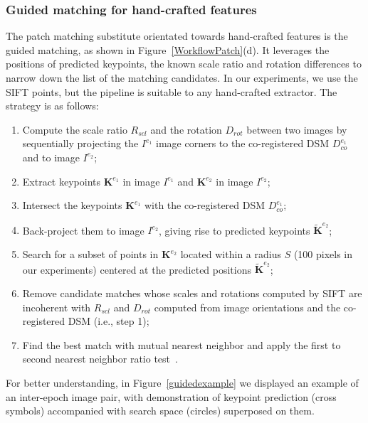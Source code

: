 \subsubsection{Guided matching for hand-crafted features} 
The patch matching substitute orientated towards hand-crafted features is the guided matching, as shown in Figure~\ref{WorkflowPatch}(d). It leverages the positions of predicted keypoints, {the known scale ratio and rotation differences to narrow down the list of the matching candidates}. In our experiments, we use the SIFT points, but the pipeline is suitable to any hand-crafted extractor.
The strategy {is as follows}:\\
\begin{enumerate}
	\item {Compute the scale ratio $R_{scl}$ and the rotation $D_{rot}$ between two images by sequentially projecting the $I^{e_1}$ image corners to the co-registered DSM $D_{co}^{e_1}$ and to image $I^{e_2}$;} %
	\item Extract keypoints $\mathbf{K}^{e_1}$ in image $I^{e_1}$ and $\mathbf{K}^{e_2}$ in image $I^{e_2}$;
	\item Intersect the keypoints $\mathbf{K}^{e_1}$ with the co-registered DSM $D_{co}^{e_1}$;
	\item Back-project them to image $I^{e_2}$, giving rise to predicted keypoints $\widetilde{\mathbf{K}}^{e_2}$;
	\item Search for a subset of points in $\mathbf{K}^{e_2}$ located within a radius $S$ (100 pixels in our experiments) centered at the predicted positions $\widetilde{\mathbf{K}}^{e_2}$;%
	\item {Remove candidate matches whose scales and rotations computed by SIFT are incoherent with $R_{scl}$ and $D_{rot}$ computed from image orientations and the co-registered DSM (i.e., step 1);}
	\item {Find the best match with mutual nearest neighbor and apply the first to second nearest neighbor ratio test~\cite{lowe2004distinctive}.}
\end{enumerate}
For better understanding, in Figure~\ref{guidedexample} we displayed an example of an inter-epoch image pair, with demonstration of keypoint prediction (cross symbols) accompanied with search space (circles) superposed on them.\\

